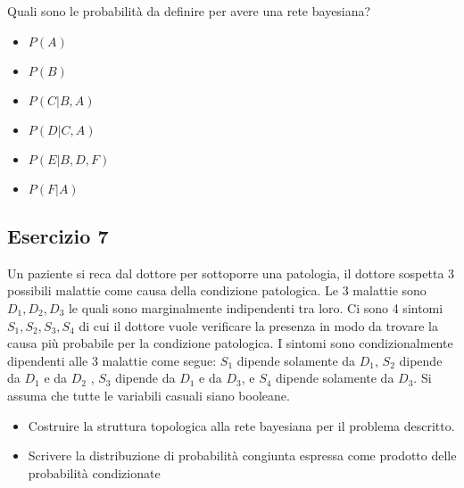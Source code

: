\documentclass{article}
\begin{document}
Quali sono le probabilità da definire per avere una rete bayesiana?
\\

\begin{itemize}
	\item \( P(A) \)
	\item \( P(B) \)
	\item \( P(C | B, A) \)
	\item \( P(D | C, A) \)
	\item \( P(E | B,D,F) \)
	\item \( P(F | A) \)
\end{itemize}

\pagebreak

 \subsection{Esercizio 7}
  Un paziente si reca dal dottore per sottoporre una patologia, il dottore sospetta 3 possibili malattie come
 causa della condizione patologica. Le 3 malattie sono \(D_1, D_2, D_3 \) le quali sono marginalmente
 indipendenti tra loro. Ci sono 4 sintomi \(S_1, S_2, S_3, S_4 \) di cui il dottore vuole verificare la presenza in modo
 da trovare la causa più probabile per la condizione patologica. I sintomi sono condizionalmente dipendenti
 alle 3 malattie come segue: \(S_1\) dipende solamente da \(D_1\), \(S_2\) dipende da \(D_1\) e da \(D_2\) , \(S_3\) dipende da \(D_1\) e da \(D_3\), e \(S_4\) dipende solamente da \(D_3\). Si assuma che tutte le variabili casuali siano booleane.
 
 \begin{itemize}
 	\item Costruire la struttura topologica alla rete bayesiana per il problema descritto.
\end{itemize}

 \begin{center}
\end{center}

 \begin{itemize}
	\item Scrivere la distribuzione di probabilità congiunta espressa come prodotto delle probabilità condizionate
\end{itemize}
\end{document}
